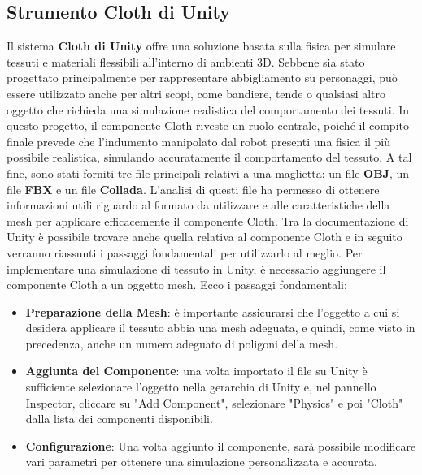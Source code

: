 \documentclass[11pt]{report}
\begin{document}
\subsection{Strumento Cloth di Unity}
Il sistema \textbf{Cloth di Unity} offre una soluzione basata sulla fisica per simulare tessuti e materiali flessibili all'interno di ambienti 3D. Sebbene sia stato progettato principalmente per rappresentare abbigliamento su personaggi, può essere utilizzato anche per altri scopi, come bandiere, tende o qualsiasi altro oggetto che richieda una simulazione realistica del comportamento dei tessuti\cite{ManualCloth}.
In questo progetto, il componente Cloth riveste un ruolo centrale, poiché il compito finale prevede che l'indumento manipolato dal robot presenti una fisica il più possibile realistica, simulando accuratamente il comportamento del tessuto. A tal fine, sono stati forniti tre file principali relativi a una maglietta: un file \textbf{OBJ}, un file \textbf{FBX} e un file \textbf{Collada}. 
L'analisi di questi file ha permesso di ottenere informazioni utili riguardo al formato da utilizzare e alle caratteristiche della mesh per applicare efficacemente il componente Cloth.
\newline
Tra la documentazione di Unity è possibile trovare anche quella relativa al componente Cloth e in seguito verranno riassunti i passaggi fondamentali per utilizzarlo al meglio.
Per implementare una simulazione di tessuto in Unity, è necessario aggiungere il componente Cloth a un oggetto mesh. Ecco i passaggi fondamentali:
\begin{itemize}
    \item \textbf{Preparazione della Mesh}: è importante assicurarsi che l'oggetto a cui si desidera applicare il tessuto abbia una mesh adeguata, e quindi, come visto in precedenza, anche un numero adeguato di poligoni della mesh.
    
    \item \textbf{Aggiunta del Componente}: una volta importato il file su Unity è sufficiente selezionare l'oggetto nella gerarchia di Unity e, nel pannello Inspector, cliccare su "Add Component", selezionare "Physics" e poi "Cloth" dalla lista dei componenti disponibili.

    \item \textbf{Configurazione}: Una volta aggiunto il componente, sarà possibile modificare vari parametri per ottenere una simulazione personalizzata e accurata.
\end{itemize}
\end{document}
